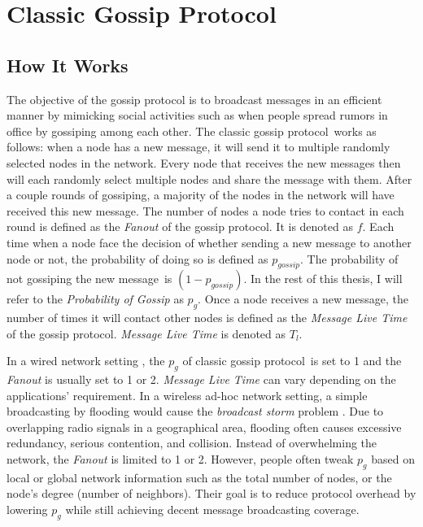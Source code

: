 \documentclass[onehalf,11pt]{beavtex}
\newcommand{\gp}{gossip protocol}
\newcommand{\pog}{Probability of Gossip}
\newcommand{\msg}{message}
\begin{document}
\section{Classic Gossip Protocol}
\subsection{How It Works} \label{basic gossip}

The objective of the gossip protocol is to broadcast messages in an efficient manner by mimicking social activities such as when people spread rumors in office by gossiping among each other. The classic \gp ~works as follows: when a node has a new message, it will send it to multiple randomly selected nodes in the network. Every node that receives the new messages then will each randomly select multiple nodes and share the message with them. After a couple rounds of gossiping, a majority of the nodes in the network will have received this new message. The number of nodes a node tries to contact in each round is defined as the \emph{Fanout} of the \gp. It is denoted as $f$. Each time when a node face the decision of whether sending a new message to another node or not, the probability of doing so is defined as $p_{gossip}$. The probability of not gossiping the new \msg ~is $(1-p_{gossip})$. In the rest of this thesis, I will refer to the \emph{\pog} as $p_g$. Once a node receives a new message, the number of times it will contact other nodes is defined as the \emph{Message Live Time} of the \gp. \emph{Message Live Time} is denoted as $T_l$.

In a wired network setting , the $p_g$ of classic \gp ~is set to 1 and the \emph{Fanout} is usually set to 1 or 2. \emph{Message Live Time} can vary depending on the applications' requirement. In a wireless ad-hoc network setting, a simple broadcasting by flooding would cause the \emph{broadcast storm} problem \cite{tseng2002broadcast}. Due to overlapping radio signals in a geographical area, flooding often causes excessive redundancy, serious contention, and collision. Instead of overwhelming the network, the \emph{Fanout} is limited to 1 or 2. However, people often tweak $p_g$ based on local or global network information such as the total number of nodes, or the node's degree (number of neighbors). Their goal is to reduce protocol overhead by lowering $p_g$ while still achieving decent message broadcasting coverage. 

\end{document}
